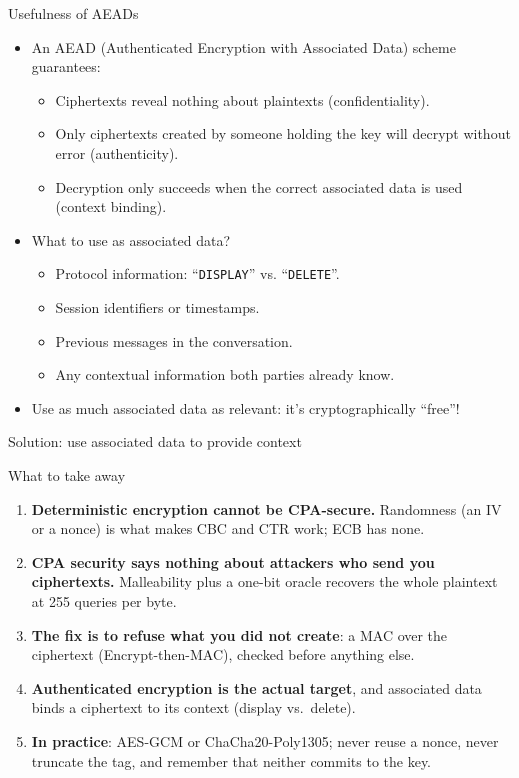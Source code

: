 \ifdefined\PRESENTATION\else\PassOptionsToClass{handout}{beamer}\fi\documentclass[aspectratio=169, lualatex]{beamer}
\begin{document}
\begin{frame}{Usefulness of AEADs}
	\begin{itemize}
		\item An AEAD (Authenticated Encryption with Associated Data) scheme guarantees:
		      \begin{itemize}
			      \item Ciphertexts reveal nothing about plaintexts (confidentiality).
			      \item Only ciphertexts created by someone holding the key will decrypt without error (authenticity).
			      \item Decryption only succeeds when the correct associated data is used (context binding).
		      \end{itemize}
		\item What to use as associated data?
		      \begin{itemize}
			      \item Protocol information: ``\texttt{DISPLAY}'' vs. ``\texttt{DELETE}''.
			      \item Session identifiers or timestamps.
			      \item Previous messages in the conversation.
			      \item Any contextual information both parties already know.
		      \end{itemize}
		\item Use as much associated data as relevant: it's cryptographically ``free''!
	\end{itemize}
\end{frame}

\begin{frame}{Solution: use associated data to provide context}
	\vspace{-0.4cm}
\end{frame}

\begin{frame}{What to take away}
	\begin{enumerate}
		\item \textbf{Deterministic encryption cannot be CPA-secure.} Randomness (an IV or a nonce) is what makes CBC and CTR work; ECB has none.
		\item \textbf{CPA security says nothing about attackers who send you ciphertexts.} Malleability plus a one-bit oracle recovers the whole plaintext at 255 queries per byte.
		\item \textbf{The fix is to refuse what you did not create}: a MAC over the ciphertext (Encrypt-then-MAC), checked before anything else.
		\item \textbf{Authenticated encryption is the actual target}, and associated data binds a ciphertext to its context (display vs.\ delete).
		\item \textbf{In practice}: AES-GCM or ChaCha20-Poly1305; never reuse a nonce, never truncate the tag, and remember that neither commits to the key.
	\end{enumerate}
\end{frame}
\end{document}
